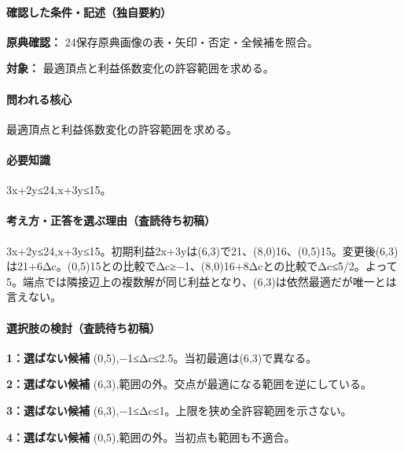 \paragraph{確認した条件・記述（独自要約）}\mbox{}\par

\noindent\textbf{原典確認：} 24保存原典画像の表・矢印・否定・全候補を照合。\par

\noindent\textbf{対象：} 最適頂点と利益係数変化の許容範囲を求める。\par

\paragraph{問われる核心} 最適頂点と利益係数変化の許容範囲を求める。

\paragraph{必要知識} 3x+2y≤24,x+3y≤15。

\paragraph{考え方・正答を選ぶ理由（査読待ち初稿）} 3x+2y≤24,x+3y≤15。初期利益2x+3yは(6,3)で21、(8,0)16、(0,5)15。変更後(6,3)は21+6Δc。(0,5)15との比較でΔc≥−1、(8,0)16+8Δcとの比較でΔc≤5/2。よって5。端点では隣接辺上の複数解が同じ利益となり、(6,3)は依然最適だが唯一とは言えない。

\paragraph{選択肢の検討（査読待ち初稿）}\mbox{}\par

\noindent\textbf{1：選ばない候補} (0,5),−1≤Δc≤2.5。当初最適は(6,3)で異なる。\par

\noindent\textbf{2：選ばない候補} (6,3),範囲の外。交点が最適になる範囲を逆にしている。\par

\noindent\textbf{3：選ばない候補} (6,3),−1≤Δc≤1。上限を狭め全許容範囲を示さない。\par

\noindent\textbf{4：選ばない候補} (0,5),範囲の外。当初点も範囲も不適合。\par

